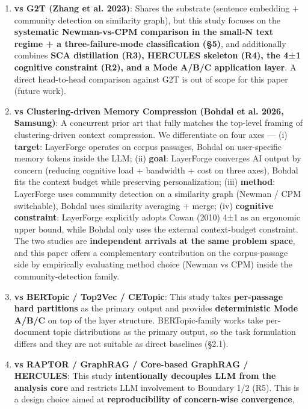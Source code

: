 \documentclass[
]{article}
\providecommand{\tightlist}{%
  \setlength{\itemsep}{0pt}\setlength{\parskip}{0pt}}
\begin{document}
\begin{enumerate}
\def\labelenumi{\arabic{enumi}.}
\tightlist
\item
  \textbf{vs G2T (Zhang et al. 2023)}: Shares the substrate (sentence
  embedding + community detection on similarity graph), but this study
  focuses on the \textbf{systematic Newman-vs-CPM comparison in the
  small-N text regime + a three-failure-mode classification (§5)}, and
  additionally combines \textbf{SCA distillation (R3), HERCULES skeleton
  (R4), the 4±1 cognitive constraint (R2), and a Mode A/B/C application
  layer}. A direct head-to-head comparison against G2T is out of scope
  for this paper (future work).
\item
  \textbf{vs Clustering-driven Memory Compression (Bohdal et al. 2026,
  Samsung)}: A concurrent prior art that fully matches the top-level
  framing of clustering-driven context compression. We differentiate on
  four axes --- (i) \textbf{target}: LayerForge operates on corpus
  passages, Bohdal on user-specific memory tokens inside the LLM; (ii)
  \textbf{goal}: LayerForge converges AI output by concern (reducing
  cognitive load + bandwidth + cost on three axes), Bohdal fits the
  context budget while preserving personalization; (iii)
  \textbf{method}: LayerForge uses community detection on a similarity
  graph (Newman / CPM switchable), Bohdal uses similarity averaging +
  merge; (iv) \textbf{cognitive constraint}: LayerForge explicitly
  adopts Cowan (2010) 4±1 as an ergonomic upper bound, while Bohdal only
  uses the external context-budget constraint. The two studies are
  \textbf{independent arrivals at the same problem space}, and this
  paper offers a complementary contribution on the corpus-passage side
  by empirically evaluating method choice (Newman vs CPM) inside the
  community-detection family.
\item
  \textbf{vs BERTopic / Top2Vec / CETopic}: This study takes
  \textbf{per-passage hard partitions} as the primary output and
  provides \textbf{deterministic Mode A/B/C} on top of the layer
  structure. BERTopic-family works take per-document topic distributions
  as the primary output, so the task formulation differs and they are
  not suitable as direct baselines (§2.1).
\item
  \textbf{vs RAPTOR / GraphRAG / Core-based GraphRAG / HERCULES}: This
  study \textbf{intentionally decouples LLM from the analysis core} and
  restricts LLM involvement to Boundary 1/2 (R5). This is a design
  choice aimed at \textbf{reproducibility of concern-wise convergence},

\end{enumerate}
\end{document}
